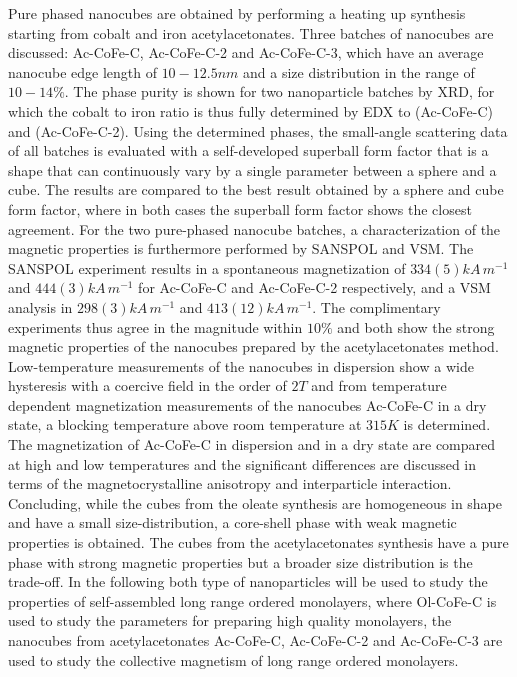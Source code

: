 \documentclass[\main/dresen_thesis.tex]{subfiles}
\begin{document}
  Pure phased nanocubes are obtained by performing a heating up synthesis starting from cobalt and iron acetylacetonates.
  Three batches of nanocubes are discussed: Ac-CoFe-C, Ac-CoFe-C-2 and Ac-CoFe-C-3, which have an average nanocube edge length of $10 - 12.5 \unit{nm}$ and a size distribution in the range of $10 - 14 \%$.
  The phase purity is shown for two nanoparticle batches by XRD, for which the cobalt to iron ratio is thus fully determined by EDX to  (Ac-CoFe-C) and  (Ac-CoFe-C-2).
  Using the determined phases, the small-angle scattering data of all batches is evaluated with a self-developed superball form factor that is a shape that can continuously vary by a single parameter between a sphere and a cube.
  The results are compared to the best result obtained by a sphere and cube form factor, where in both cases the superball form factor shows the closest agreement.
  For the two pure-phased nanocube batches, a characterization of the magnetic properties is furthermore performed by SANSPOL and VSM.
  The SANSPOL experiment results in a spontaneous magnetization of $334(5) \unit{kA \, m^{-1}}$ and $444(3) \unit{kA \, m^{-1}}$ for Ac-CoFe-C and Ac-CoFe-C-2 respectively, and a VSM analysis in $298(3) \unit{kA \, m^{-1}}$ and $413(12) \unit{kA \, m^{-1}}$.
  The complimentary experiments thus agree in the magnitude within $10 \%$ and both show the strong magnetic properties of the nanocubes prepared by the acetylacetonates method.
  Low-temperature measurements of the nanocubes in dispersion show a wide hysteresis with a coercive field in the order of $2 \unit{T}$ and from temperature dependent magnetization measurements of the nanocubes Ac-CoFe-C in a dry state, a blocking temperature above room temperature at $315 \unit{K}$ is determined.
  The magnetization of Ac-CoFe-C in dispersion and in a dry state are compared at high and low temperatures and the significant differences are discussed in terms of the magnetocrystalline anisotropy and interparticle interaction.
  \\

  Concluding, while the cubes from the oleate synthesis are homogeneous in shape and have a small size-distribution, a core-shell phase with weak magnetic properties is obtained.
  The cubes from the acetylacetonates synthesis have a pure phase with strong magnetic properties but a broader size distribution is the trade-off.
  In the following both type of nanoparticles will be used to study the properties of self-assembled long range ordered monolayers, where Ol-CoFe-C is used to study the parameters for preparing high quality monolayers, the nanocubes from acetylacetonates Ac-CoFe-C, Ac-CoFe-C-2 and Ac-CoFe-C-3 are used to study the collective magnetism of long range ordered monolayers.
\end{document}
